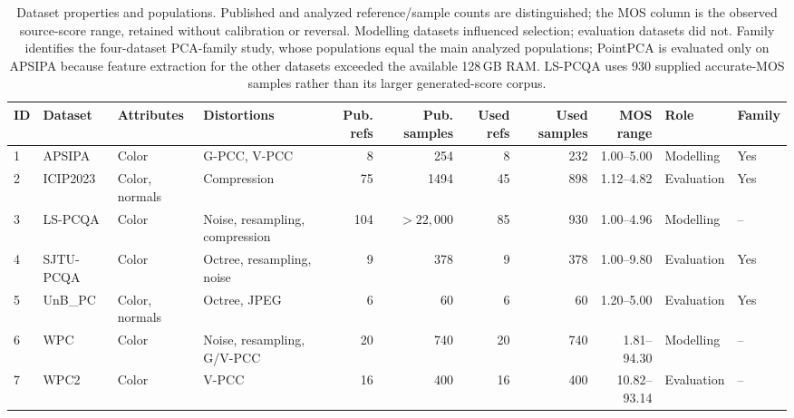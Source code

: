 \documentclass[final,3p,times,twocolumn]{elsarticle}
\begin{document}
\begin{table}[t!]
    \centering
    \caption{Dataset properties and populations. Published and analyzed reference/sample counts are distinguished; the MOS column is the observed source-score range, retained without calibration or reversal. Modelling datasets influenced selection; evaluation datasets did not. Family identifies the four-dataset PCA-family study, whose populations equal the main analyzed populations; PointPCA is evaluated only on APSIPA because feature extraction for the other datasets exceeded the available 128\,\gls{GB} \gls{RAM}. LS-PCQA uses 930 supplied accurate-MOS samples rather than its larger generated-score corpus.}
    \label{tab_datasets}

    \scriptsize
    \begin{adjustbox}{max width=\textwidth}
        \begin{tabular}{llllrrrrrll}
        \toprule
        ID & Dataset & Attributes & Distortions & Pub. refs & Pub. samples & Used refs & Used samples & MOS range & Role & Family \\
        \midrule
        1 & APSIPA \cite{apsipa_dataset} & Color & G-PCC, V-PCC & 8 & 254 & 8 & 232 & 1.00--5.00 & Modelling & Yes \\
        2 & ICIP2023 \cite{basics_dataset} & Color, normals & Compression & 75 & 1494 & 45 & 898 & 1.12--4.82 & Evaluation & Yes \\
        3 & LS-PCQA \cite{liu2023lspcqa} & Color & Noise, resampling, compression & 104 & $>22{,}000$ & 85 & 930 & 1.00--4.96 & Modelling & -- \\
        4 & SJTU-PCQA \cite{yang2020predicting} & Color & Octree, resampling, noise & 9 & 378 & 9 & 378 & 1.00--9.80 & Evaluation & Yes \\
        5 & UnB\_PC \cite{Torlig2018anovel} & Color, normals & Octree, JPEG & 6 & 60 & 6 & 60 & 1.20--5.00 & Evaluation & Yes \\
        6 & WPC \cite{wpc} & Color & Noise, resampling, G/V-PCC & 20 & 740 & 20 & 740 & 1.81--94.30 & Modelling & -- \\
        7 & WPC2 \cite{liu2021wpc2} & Color & V-PCC & 16 & 400 & 16 & 400 & 10.82--93.14 & Evaluation & -- \\
        \bottomrule
        \end{tabular}
    \end{adjustbox}
\end{table}
\end{document}
